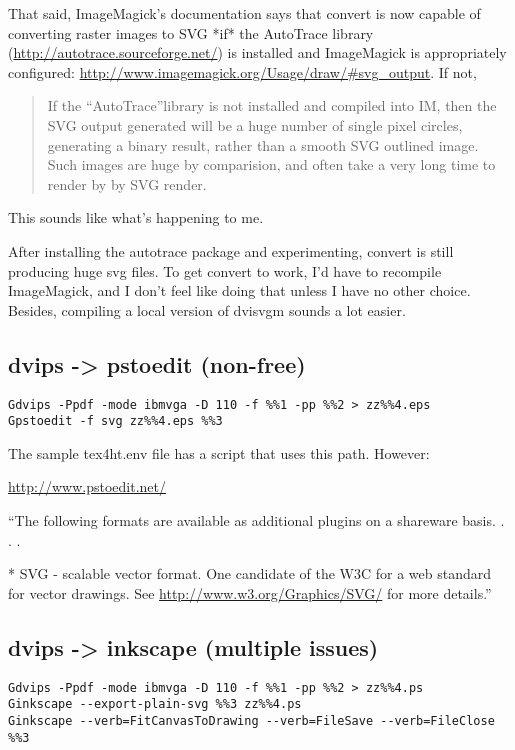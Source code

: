 \documentclass[12pt]{article}
\begin{document}
That said, ImageMagick's documentation says that convert is now
capable of converting raster images to SVG *if* the AutoTrace library
(\url{http://autotrace.sourceforge.net/}) is installed and ImageMagick
is appropriately configured:
\url{http://www.imagemagick.org/Usage/draw/#svg_output}.  If not,

\begin{quote}
  If the ``AutoTrace''library is not installed and compiled into IM,
  then the SVG output generated will be a huge number of single pixel
  circles, generating a binary result, rather than a smooth SVG
  outlined image. Such images are huge by comparision, and often take
  a very long time to render by by SVG render.  
\end{quote}

This sounds like what's happening to me.

After installing the autotrace package and experimenting, convert is
still producing huge svg files.  To get convert to work, I'd have to
recompile ImageMagick, and I don't feel like doing that unless I have
no other choice.  Besides, compiling a local version of dvisvgm sounds
a lot easier.

\subsection{dvips -> pstoedit (non-free)}
\label{sec:dvips_pstoedit}

\begin{lstlisting}
Gdvips -Ppdf -mode ibmvga -D 110 -f %%1 -pp %%2 > zz%%4.eps
Gpstoedit -f svg zz%%4.eps %%3  
\end{lstlisting}

The sample tex4ht.env file has a script that uses this path.  However:

\url{http://www.pstoedit.net/}

``The following formats are available as additional plugins on a
shareware basis. . . .

* SVG - scalable vector format. One candidate of the W3C for a web
  standard for vector drawings. See \url{http://www.w3.org/Graphics/SVG/}
  for more details.''

\subsection{dvips -> inkscape (multiple issues)}
\label{sec:dvips_inkscape}

\begin{lstlisting}
Gdvips -Ppdf -mode ibmvga -D 110 -f %%1 -pp %%2 > zz%%4.ps
Ginkscape --export-plain-svg %%3 zz%%4.ps
Ginkscape --verb=FitCanvasToDrawing --verb=FileSave --verb=FileClose %%3
\end{lstlisting}
\end{document}
